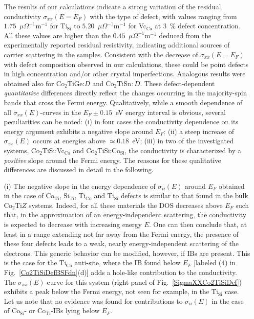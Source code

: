 \documentclass[aps,prb,twocolumn,superscriptaddress,showpacs]{revtex4}
\newcommand{\FG}[1]{Fig.~\ref{#1}}
\begin{document}
The results of our calculations indicate a strong variation 
of the residual conductivity $\sigma_{xx}(E=E_F)$ with the 
type of defect, with values ranging from $1.75$~$\mu\Omega^{-1}\text{m}^{-1}$
for Ti$_\text{Si}$ to $5.20$~$\mu\Omega^{-1}\text{m}^{-1}$ 
for Vc$_\text{Co}$ at $3$~\% defect concentration. 
All these values are higher than the
$0.45$~$\mu\Omega^{-1}\text{m}^{-1}$ deduced from the
experimentally reported residual resistivity,\cite{BFB+10}
indicating additional sources of carrier scattering in the samples.
Consistent with the decrease of $\sigma_{xx}(E=E_F)$ with defect 
composition observed in our calculations, 
these could be point defects in high concentration and/or other 
crystal imperfections. Analogous results were
obtained also for Co$_2$TiGe:$D$ and 
Co$_2$TiSn$:D$.
These defect-dependent {\em quantitative} differences directly
reflect the changes occurring in the majority-spin bands 
that cross the Fermi energy. 
Qualitatively, while a smooth dependence of all
$\sigma_{xx}(E)$-curves in
the $E_F\pm 0.15$~eV energy interval is obvious,
several peculiarities can be noted:
(i) in four cases the conductivity dependence
on its energy argument exhibits
a negative slope around $E_F$;
(ii) a steep increase of $\sigma_{xx}(E)$ occurs 
at energies above $\simeq 0.18$~eV; 
(iii) in two of the investigated systems, 
Co$_2$TiSi:Vc$_\text{Co}$ and Co$_2$TiSi:Co$_\text{Si}$, 
the conductivity is characterized by a {\em positive} 
slope around the Fermi energy. The reasons for these qualitative 
differences are discussed in detail in the following. 


(i) The negative slope in the energy dependence of 
$\sigma_{ii}(E)$ around $E_F$ obtained in the case 
of Co$_\text{Ti}$, Si$_\text{Ti}$,
Ti$_\text{Co}$ and Ti$_\text{Si}$ defects is similar to that
found in the bulk Co$_2$Ti$Z$ systems.\cite{GKP14,BFB+10} 
Indeed, for all these materials the DOS
decreases above $E_F$ such that, in the approximation of
an energy-independent scattering,
the conductivity is expected to decrease with increasing
energy $E$. One can then conclude that, at
least in a range extending not far away from the Fermi
energy, the presence of these four defects leads to
a weak, nearly energy-independent scattering 
of the electrons. 
This generic behavior can be modified,
however, if IBs are present. This is the case for
the Ti$_\text{Co}$ anti-site, where
the IB found below $E_F$ [labeled (4)
in \FG{Co2TiSiDefBSFdn}(d)] adds a hole-like contribution
to the conductivity. The $\sigma_{xx}(E)$-curve for this
system (right panel of \FG{SigmaXXCo2TiSiDef})
exhibits a peak below the Fermi energy, not seen
for example, in the Ti$_\text{Si}$ case.
Let us note that no evidence
was found for contributions to $\sigma_{ii}(E)$ in
the case of Co$_\text{Si}$- or Co$_\text{Ti}$-IBs
lying below $E_F$.
\end{document}
